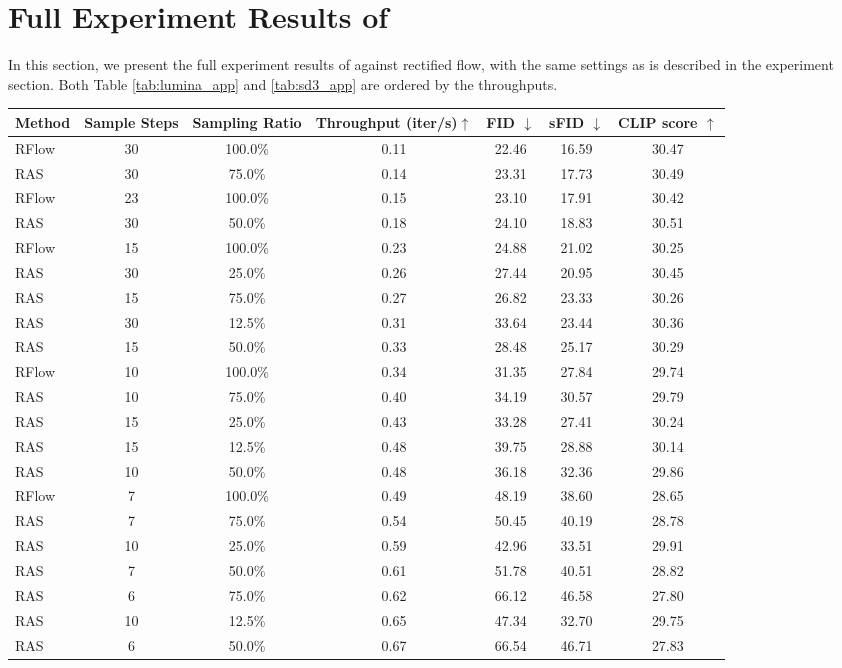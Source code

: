 \clearpage

\section{Full Experiment Results of \ourmethod{}}
\label{sec:fullexp}
In this section, we present the full experiment results of \ourmethod{} against rectified flow, with the same settings as is described in the experiment section. Both Table \ref{tab:lumina_app} and \ref{tab:sd3_app} are ordered by the throughputs.


\begin{table*}[hb]
\centering
\begin{tabular}{lcccccc}
\hline
Method & Sample Steps & Sampling Ratio & Throughput (iter/s)$\uparrow$ & FID $\downarrow$ & sFID $\downarrow$ & CLIP score $\uparrow$ \\
\hline
\rowcolor{gray!10} RFlow & 30 & 100.0\% & 0.11 & 22.46 & 16.59 & 30.47 \\
RAS & 30 & 75.0\% & 0.14 & 23.31 & 17.73 & 30.49 \\
\rowcolor{gray!10} RFlow & 23 & 100.0\% & 0.15 & 23.10 & 17.91 & 30.42 \\
RAS & 30 & 50.0\% & 0.18 & 24.10 & 18.83 & 30.51 \\
\rowcolor{gray!10} RFlow & 15 & 100.0\% & 0.23 & 24.88 & 21.02 & 30.25 \\
RAS & 30 & 25.0\% & 0.26 & 27.44 & 20.95 & 30.45 \\
RAS & 15 & 75.0\% & 0.27 & 26.82 & 23.33 & 30.26 \\
RAS & 30 & 12.5\% & 0.31 & 33.64 & 23.44 & 30.36 \\

RAS & 15 & 50.0\% & 0.33 & 28.48 & 25.17 & 30.29 \\
\rowcolor{gray!10} RFlow & 10 & 100.0\% & 0.34 & 31.35 & 27.84 & 29.74 \\
RAS & 10 & 75.0\% & 0.40 & 34.19 & 30.57 & 29.79 \\
RAS & 15 & 25.0\% & 0.43 & 33.28 & 27.41 & 30.24 \\
RAS & 15 & 12.5\% & 0.48 & 39.75 & 28.88 & 30.14 \\


RAS & 10 & 50.0\% & 0.48 & 36.18 & 32.36 & 29.86 \\
\rowcolor{gray!10} RFlow & 7 & 100.0\% & 0.49 & 48.19 & 38.60 & 28.65 \\
RAS & 7 & 75.0\% & 0.54 & 50.45 & 40.19 & 28.78 \\
RAS & 10 & 25.0\% & 0.59 & 42.96 & 33.51 & 29.91 \\
RAS & 7 & 50.0\% & 0.61 & 51.78 & 40.51 & 28.82 \\
RAS & 6 & 75.0\% & 0.62 & 66.12 & 46.58 & 27.80 \\
RAS & 10 & 12.5\% & 0.65 & 47.34 & 32.70 & 29.75 \\
RAS & 6 & 50.0\% & 0.67 & 66.54 & 46.71 & 27.83 \\


\end{tabular}
\end{table*}
